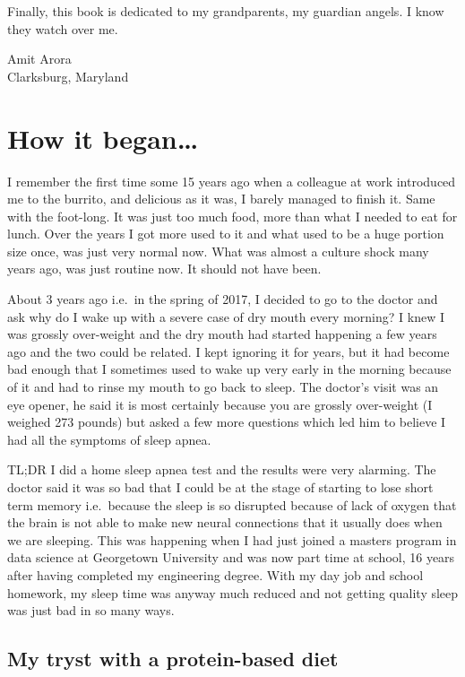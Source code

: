 \documentclass[
  oneside]{book}
\begin{document}
Finally, this book is dedicated to my grandparents, my guardian angels. I know they watch over me.

Amit Arora\\
Clarksburg, Maryland

\hypertarget{how-it-began}{%
\chapter{How it began\ldots{}}\label{how-it-began}}

I remember the first time some 15 years ago when a colleague at work introduced me to the burrito, and delicious as it was, I barely managed to finish it. Same with the foot-long. It was just too much food, more than what I needed to eat for lunch. Over the years I got more used to it and what used to be a huge portion size once, was just very normal now. What was almost a culture shock many years ago, was just routine now. It should not have been.

About 3 years ago i.e.~in the spring of 2017, I decided to go to the doctor and ask why do I wake up with a severe case of dry mouth every morning? I knew I was grossly over-weight and the dry mouth had started happening a few years ago and the two could be related. I kept ignoring it for years, but it had become bad enough that I sometimes used to wake up very early in the morning because of it and had to rinse my mouth to go back to sleep. The doctor's visit was an eye opener, he said it is most certainly because you are grossly over-weight (I weighed 273 pounds) but asked a few more questions which led him to believe I had all the symptoms of sleep apnea.

TL;DR I did a home sleep apnea test and the results were very alarming. The doctor said it was so bad that I could be at the stage of starting to lose short term memory i.e.~because the sleep is so disrupted because of lack of oxygen that the brain is not able to make new neural connections that it usually does when we are sleeping. This was happening when I had just joined a masters program in data science at Georgetown University and was now part time at school, 16 years after having completed my engineering degree. With my day job and school homework, my sleep time was anyway much reduced and not getting quality sleep was just bad in so many ways.

\hypertarget{my-tryst-with-a-protein-based-diet}{%
\section{My tryst with a protein-based diet}\label{my-tryst-with-a-protein-based-diet}}
\end{document}
